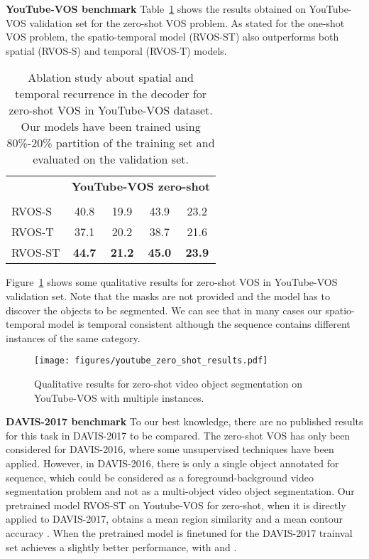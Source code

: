 \documentclass[10pt,twocolumn,letterpaper]{article}
\begin{document}
\textbf{YouTube-VOS benchmark} Table~\ref{tab:zeroshot_youtube} shows the results obtained on YouTube-VOS validation set for the zero-shot VOS problem. As stated for the one-shot VOS problem, the spatio-temporal model (RVOS-ST) also outperforms both spatial (RVOS-S) and temporal (RVOS-T) models. 

\begin{table}[]
\centering
\begin{tabular}{@{}lcccc@{}}
\toprule
\multicolumn{1}{c}{}  &  \multicolumn{4}{c}{\textbf{YouTube-VOS zero-shot}} \\
    &   &   &      &   \\  
\midrule
RVOS-S                              & 40.8    & 19.9    & 43.9 & 23.2 \\
RVOS-T                              & 37.1    & 20.2    & 38.7 & 21.6 \\
RVOS-ST                             & \textbf{44.7}    & \textbf{21.2}    & \textbf{45.0} & \textbf{23.9} \\
\bottomrule
\end{tabular}
\caption{Ablation study about spatial and temporal recurrence in the decoder for zero-shot VOS in YouTube-VOS dataset. Our models have been trained using 80\%-20\% partition of the training set and evaluated on the validation set.}
\label{tab:zeroshot_youtube}
\end{table}

Figure~\ref{fig:youtube-zeroshot-qualitative-results} shows some qualitative results for zero-shot VOS in YouTube-VOS validation set. Note that the masks are not provided and the model has to discover the objects to be segmented. We can see that in many cases our spatio-temporal model is temporal consistent although the sequence contains different instances of the same category.

\begin{figure}
    \centering
    \texttt{[image: figures/youtube\_zero\_shot\_results.pdf]}
    \caption{Qualitative results for zero-shot video object segmentation on YouTube-VOS with multiple instances.}
\label{fig:youtube-zeroshot-qualitative-results}
\end{figure}



\textbf{DAVIS-2017 benchmark} To our best knowledge, there are no published results for this task in DAVIS-2017 to be compared. The zero-shot VOS has only been considered for DAVIS-2016, where some unsupervised techniques have been applied. However, in DAVIS-2016, there is only a single object annotated for sequence, which could be considered as a foreground-background video segmentation problem and not as a multi-object video object segmentation. Our pretrained model RVOS-ST on Youtube-VOS for zero-shot, when it is directly applied to DAVIS-2017, obtains a mean region similarity  and a mean contour accuracy . When the pretrained model is finetuned for the DAVIS-2017 trainval set achieves a slightly better performance, with  and .
\end{document}
